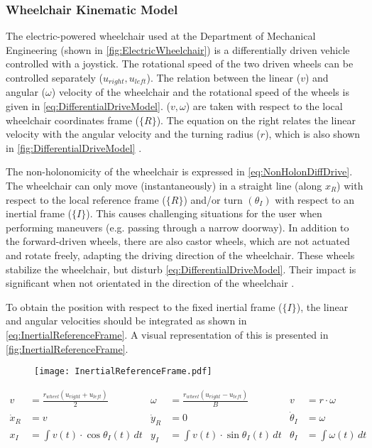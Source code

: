 \subsubsection{Wheelchair Kinematic Model}
The electric-powered wheelchair used at the Department of Mechanical Engineering (shown in \cref{fig:ElectricWheelchair}) is a differentially driven vehicle controlled with a joystick. The rotational speed of the two driven wheels can be controlled separately ($u_{right},u_{left}$). The relation between the linear ($v$) and angular ($\omega$) velocity of the wheelchair and the rotational speed of the wheels is given in \cref{eq:DifferentialDriveModel}. ($v,\omega$) are taken with respect to the local wheelchair coordinates frame ($\{R\}$). The equation on the right relates the linear velocity with the angular velocity and the turning radius ($r$), which is also shown in \cref{fig:DifferentialDriveModel} \cite{VanderPoortenEtAl2012}. 

The non-holonomicity of the wheelchair is expressed in \cref{eq:NonHolonDiffDrive}. The wheelchair can only move (instantaneously) in a straight line (along $x_R$) with respect to the local reference frame ($\{R\}$) and/or turn $(\theta_I)$ with respect to an inertial frame ($\{I\}$). This causes challenging situations for the user when performing maneuvers (e.g. passing through a narrow doorway). In addition to the forward-driven wheels, there are also castor wheels, which are not actuated and rotate freely, adapting the driving direction of the wheelchair. These wheels stabilize the wheelchair, but disturb \cref{eq:DifferentialDriveModel}. Their impact is significant when not orientated in the direction of the wheelchair \cite{VanderPoortenEtAl2012}.

To obtain the position with respect to the fixed inertial frame ($\{I\}$), the linear and angular velocities should be integrated as shown in \cref{eq:InertialReferenceFrame}. A visual representation of this is presented in \cref{fig:InertialReferenceFrame}. 

\begin{figure}[!htbp]
\centering
\texttt{[image: InertialReferenceFrame.pdf]}
\end{figure}

\begin{align}
v &= \frac{r_{wheel}(u_{right} + u_{left})}{2} & \omega &= \frac{r_{wheel}(u_{right} - u_{left})}{B} & v &= r \cdot \omega \label{eq:DifferentialDriveModel} \\
\dot{x}_R &= v & \dot{y}_R &= 0 & \dot{\theta}_I &= \omega \label{eq:NonHolonDiffDrive} \\
x_I &= \int v(t) \cdot \cos \theta_I(t) \, dt & y_I &= \int v(t) \cdot \sin \theta_I(t) \, dt & \theta_I &= \int \omega(t) \, dt \label{eq:InertialReferenceFrame}
\end{align}


